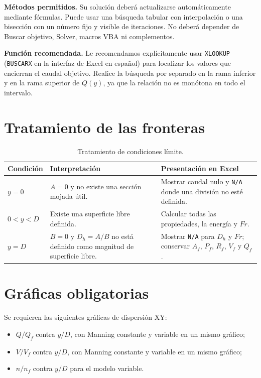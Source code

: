 \documentclass[12pt]{article}
\begin{document}
\begin{infobox}
\textbf{Métodos permitidos.} Su solución deberá actualizarse automáticamente mediante fórmulas. Puede usar una búsqueda tabular con interpolación o una bisección con un número fijo y visible de iteraciones. No deberá depender de Buscar objetivo, Solver, macros VBA ni complementos.

\textbf{Función recomendada.} Le recomendamos explícitamente usar \texttt{XLOOKUP} (\texttt{BUSCARX} en la interfaz de Excel en español) para localizar los valores que encierran el caudal objetivo. Realice la búsqueda por separado en la rama inferior y en la rama superior de $Q(y)$, ya que la relación no es monótona en todo el intervalo.
\end{infobox}

\section{Tratamiento de las fronteras}
\begin{table}[H]
\centering
\caption{Tratamiento de condiciones límite.}
\begin{tabularx}{\textwidth}{>{\raggedright\arraybackslash}p{} >{\raggedright\arraybackslash}p{} >{\raggedright\arraybackslash}X}
\toprule
\textbf{Condición} & \textbf{Interpretación} & \textbf{Presentación en Excel} \\
\midrule
$y=0$ & $A=0$ y no existe una sección mojada útil. & Mostrar caudal nulo y \texttt{N/A} donde una división no esté definida. \\
$0<y<D$ & Existe una superficie libre definida. & Calcular todas las propiedades, la energía y $Fr$. \\
$y=D$ & $B=0$ y $D_h=A/B$ no está definido como magnitud de superficie libre. & Mostrar \texttt{N/A} para $D_h$ y $Fr$; conservar $A_f$, $P_f$, $R_f$, $V_f$ y $Q_f$. \\
\bottomrule
\end{tabularx}
\end{table}

\section{Gráficas obligatorias}
Se requieren las siguientes gráficas de dispersión XY:
\begin{itemize}
\item $Q/Q_f$ contra $y/D$, con Manning constante y variable en un mismo gráfico;
\item $V/V_f$ contra $y/D$, con Manning constante y variable en un mismo gráfico;
\item $n/n_f$ contra $y/D$ para el modelo variable.
\end{itemize}
\end{document}
